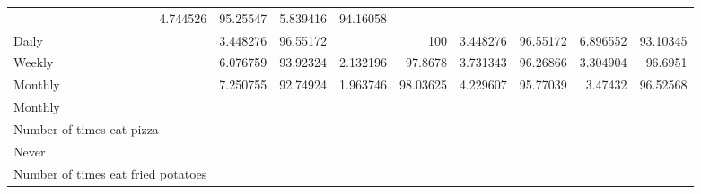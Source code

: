 \documentclass{article}
\begin{document}
\begin{tabular}{lllllllll}
  \multicolumn{1}{r}{4.744526} &
  \multicolumn{1}{r}{95.25547} &
  \multicolumn{1}{r}{5.839416} &
  \multicolumn{1}{r}{94.16058} \\
\multicolumn{1}{l}{\hspace{7em}Daily} &
  \multicolumn{1}{|r}{3.448276} &
  \multicolumn{1}{r}{96.55172} &
  \multicolumn{1}{r}{} &
  \multicolumn{1}{r}{100} &
  \multicolumn{1}{r}{3.448276} &
  \multicolumn{1}{r}{96.55172} &
  \multicolumn{1}{r}{6.896552} &
  \multicolumn{1}{r}{93.10345} \\
\multicolumn{1}{l}{\hspace{7em}Weekly} &
  \multicolumn{1}{|r}{6.076759} &
  \multicolumn{1}{r}{93.92324} &
  \multicolumn{1}{r}{2.132196} &
  \multicolumn{1}{r}{97.8678} &
  \multicolumn{1}{r}{3.731343} &
  \multicolumn{1}{r}{96.26866} &
  \multicolumn{1}{r}{3.304904} &
  \multicolumn{1}{r}{96.6951} \\
\multicolumn{1}{l}{\hspace{7em}Monthly} &
  \multicolumn{1}{|r}{7.250755} &
  \multicolumn{1}{r}{92.74924} &
  \multicolumn{1}{r}{1.963746} &
  \multicolumn{1}{r}{98.03625} &
  \multicolumn{1}{r}{4.229607} &
  \multicolumn{1}{r}{95.77039} &
  \multicolumn{1}{r}{3.47432} &
  \multicolumn{1}{r}{96.52568} \\
\multicolumn{1}{l}{\hspace{3em}Monthly} &
  \multicolumn{1}{|r}{} &
  \multicolumn{1}{r}{} &
  \multicolumn{1}{r}{} &
  \multicolumn{1}{r}{} &
  \multicolumn{1}{r}{} &
  \multicolumn{1}{r}{} &
  \multicolumn{1}{r}{} &
  \multicolumn{1}{r}{} \\
\multicolumn{1}{l}{\hspace{4em}Number of times eat pizza} &
  \multicolumn{1}{|r}{} &
  \multicolumn{1}{r}{} &
  \multicolumn{1}{r}{} &
  \multicolumn{1}{r}{} &
  \multicolumn{1}{r}{} &
  \multicolumn{1}{r}{} &
  \multicolumn{1}{r}{} &
  \multicolumn{1}{r}{} \\
\multicolumn{1}{l}{\hspace{5em}Never} &
  \multicolumn{1}{|r}{} &
  \multicolumn{1}{r}{} &
  \multicolumn{1}{r}{} &
  \multicolumn{1}{r}{} &
  \multicolumn{1}{r}{} &
  \multicolumn{1}{r}{} &
  \multicolumn{1}{r}{} &
  \multicolumn{1}{r}{} \\
\multicolumn{1}{l}{\hspace{6em}Number of times eat fried potatoes} &
  \multicolumn{1}{|r}{} &
  \multicolumn{1}{r}{} &
  \multicolumn{1}{r}{} &
  \multicolumn{1}{r}{} &
  \multicolumn{1}{r}{} &
  \multicolumn{1}{r}{} &
  \multicolumn{1}{r}{} &
  \multicolumn{1}{r}{} \\

\end{tabular}
\end{document}
